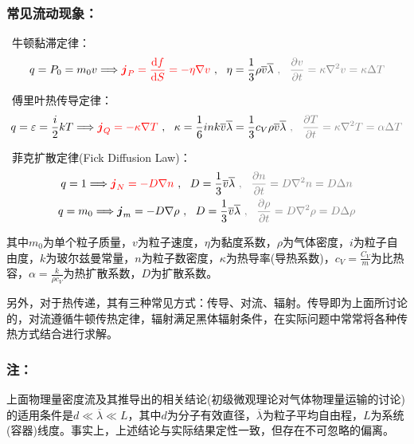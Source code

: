 \documentclass[zihao=-4,UTF8]{report}
\begin{document}
\subsubsection{常见流动现象：}
\ 牛顿黏滞定律：
\begin{equation}
    q = P_0 = m_0v \Longrightarrow \textcolor{red}{\boldsymbol{j}_P = \frac{\mathrm{d}f}{\mathrm{d}S} = - \eta \nabla v }\ ,\ \  \eta = \frac{1}{3}\rho \overline{v}\overline{\lambda} \textcolor{gray}{\ , \ \ \frac{\partial v}{\partial t} =\kappa \nabla^2 v =\kappa \Delta T}
\end{equation}\par
{}\ 傅里叶热传导定律：
\begin{equation}
    q = \varepsilon = \frac{i}{2}kT \Longrightarrow \textcolor{red}{\boldsymbol{j}_Q = -\kappa \nabla T }\ ,\ \ \kappa = \frac{1}{6}ink\overline{v}\overline{\lambda} = \frac{1}{3}c_V\rho \overline{v} \overline{\lambda} \textcolor{gray}{\ , \ \ \frac{\partial T}{\partial t} =\kappa \nabla^2 T =\alpha \Delta T}
\end{equation}\par
{}\ 菲克扩散定律(Fick Diffusion Law)：
\begin{gather}
    q = 1 \Longrightarrow \textcolor{red}{\boldsymbol{j}_N = -D\nabla n}\ ,\ \ D = \frac{1}{3}\overline{v}\overline{\lambda} \textcolor{gray}{\ , \ \ \frac{\partial n}{\partial t} =D \nabla^2 n =D\Delta n}\\ 
    q = m_0 \Longrightarrow \boldsymbol{j}_m = -D\nabla \rho\ ,\ \ D = \frac{1}{3}\overline{v}\overline{\lambda}\textcolor{gray}{\ , \ \ \frac{\partial \rho}{\partial t} =D \nabla^2 \rho=D\Delta \rho}
\end{gather}\par
{\color{gray}\small 其中$m_0$为单个粒子质量，$v$为粒子速度，$\eta$为黏度系数，$\rho$为气体密度，$i$为粒子自由度，$k$为玻尔兹曼常量，$n$为粒子数密度，$\kappa$为热导率(导热系数)，$c_V = \frac{C_V}{m}$为比热容，$\alpha = \frac{k}{\rho c_V}$为热扩散系数，$D$为扩散系数。\par
另外，对于热传递，其有三种常见方式：传导、对流、辐射。传导即为上面所讨论的，对流遵循牛顿传热定律，辐射满足黑体辐射条件，在实际问题中常常将各种传热方式结合进行求解。}\par

\subsubsection{注：}上面物理量密度流及其推导出的相关结论(初级微观理论对气体物理量运输的讨论)的适用条件是$d \ll \overline{\lambda}\ll L$，其中$d$为分子有效直径，$\overline{\lambda}$为粒子平均自由程，$L$为系统(容器)线度。事实上，上述结论与实际结果定性一致，但存在不可忽略的偏离。
\end{document}
